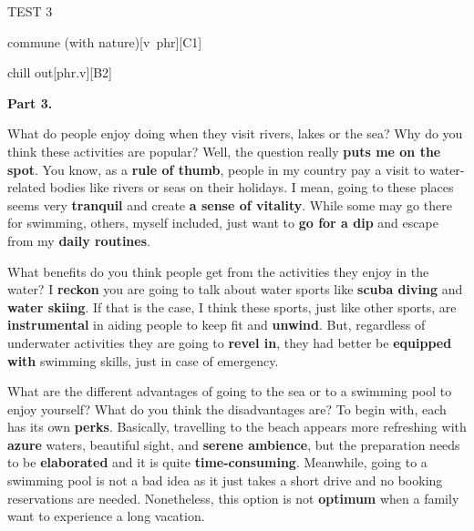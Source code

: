 \begin{glossarymc}[Cambridge 4]
\begin{test}{TEST 3}
\begin{VocabExplain}[Part 2]
			\begin{ExplainCard}{commune (with nature)}[v~phr][C1]
			\end{ExplainCard}

			\begin{ExplainCard}{chill out}[phr.v][B2]
			\end{ExplainCard}
        \end{VocabExplain}

    \noindent
    \textbf{Part 3.}
	\begin{qa}{What do people enjoy doing when they visit rivers, lakes or the sea? Why do you think these activities are popular?}
	Well, the question really \textbf{puts me on the spot}. You know, as a \textbf{rule of thumb}, people in my country pay a visit to water-related bodies like rivers or seas on their holidays. I mean, going to these places seems very \textbf{tranquil} and create \textbf{a sense of vitality}. While some may go there for swimming, others, myself included, just want to \textbf{go for a dip} and escape from my \textbf{daily routines}.
	\end{qa}

	\begin{qa}{What benefits do you think people get from the activities they enjoy in the water?}
	I \textbf{reckon} you are going to talk about water sports like \textbf{scuba diving} and \textbf{water skiing}. If that is the case, I think these sports, just like other sports, are \textbf{instrumental} in aiding people to keep fit and \textbf{unwind}. But, regardless of underwater activities they are going to \textbf{revel in}, they had better be \textbf{equipped with} swimming skills, just in case of emergency.
	\end{qa}

	\begin{qa}{What are the different advantages of going to the sea or to a swimming pool to enjoy yourself? What do you think the disadvantages are?}
	To begin with, each has its own \textbf{perks}. Basically, travelling to the beach appears more refreshing with \textbf{azure} waters, beautiful sight, and \textbf{serene ambience}, but the preparation needs to be \textbf{elaborated} and it is quite \textbf{time-consuming}. Meanwhile, going to a swimming pool is not a bad idea as it just takes a short drive and no booking reservations are needed. Nonetheless, this option is not \textbf{optimum} when a family want to experience a long vacation.
	\end{qa}


\end{test}
\end{glossarymc}
